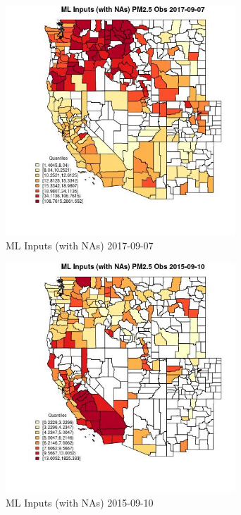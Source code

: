 \begin{figure} 
\centering  
\includegraphics[width=0.77\textwidth]{Code_Outputs/Report_ML_input_PM25_Step4_part_e_de_duplicated_aveswNAs_CountyPM25_ObsMean2017-09-07_2017-09-07.jpg} 
\caption{\label{fig:Report_ML_input_PM25_Step4_part_e_de_duplicated_aveswNAsCountyPM25_ObsMean2017-09-07_2017-09-07}ML Inputs (with NAs) 2017-09-07} 
\end{figure} 
 

\begin{figure} 
\centering  
\includegraphics[width=0.77\textwidth]{Code_Outputs/Report_ML_input_PM25_Step4_part_e_de_duplicated_aveswNAs_CountyPM25_ObsMean2015-09-10_2015-09-10.jpg} 
\caption{\label{fig:Report_ML_input_PM25_Step4_part_e_de_duplicated_aveswNAsCountyPM25_ObsMean2015-09-10_2015-09-10}ML Inputs (with NAs) 2015-09-10} 
\end{figure} 
 

